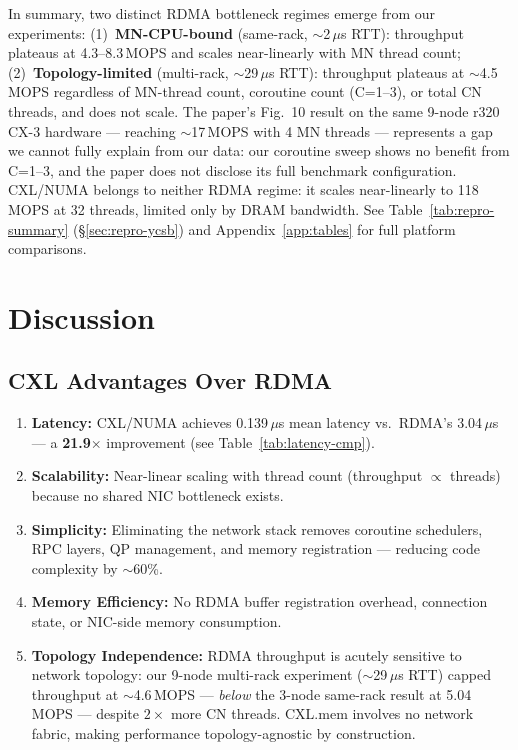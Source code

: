 \documentclass[conference]{IEEEtran}
\begin{document}
In summary, two distinct RDMA bottleneck regimes emerge from our experiments: (1)~\textbf{MN-CPU-bound} (same-rack, $\sim$2\,$\mu$s RTT): throughput plateaus at 4.3--8.3\,MOPS and scales near-linearly with MN thread count; (2)~\textbf{Topology-limited} (multi-rack, $\sim$29\,$\mu$s RTT): throughput plateaus at $\sim$4.5\,MOPS regardless of MN-thread count, coroutine count (C=1--3), or total CN threads, and does not scale. The paper's Fig.~10 result on the same 9-node r320 CX-3 hardware --- reaching $\sim$17\,MOPS with 4 MN threads --- represents a gap we cannot fully explain from our data: our coroutine sweep shows no benefit from C=1--3, and the paper does not disclose its full benchmark configuration. CXL/NUMA belongs to neither RDMA regime: it scales near-linearly to 118\,MOPS at 32 threads, limited only by DRAM bandwidth. See Table~\ref{tab:repro-summary} (\S\ref{sec:repro-ycsb}) and Appendix~\ref{app:tables} for full platform comparisons.

\section{Discussion}

\subsection{CXL Advantages Over RDMA}

\begin{enumerate}[nosep]
  \item \textbf{Latency:} CXL/NUMA achieves 0.139\,$\mu$s mean latency vs.\ RDMA's 3.04\,$\mu$s --- a \textbf{21.9$\times$} improvement (see Table~\ref{tab:latency-cmp}).
  \item \textbf{Scalability:} Near-linear scaling with thread count (throughput $\propto$ threads) because no shared NIC bottleneck exists.
  \item \textbf{Simplicity:} Eliminating the network stack removes coroutine schedulers, RPC layers, QP management, and memory registration --- reducing code complexity by $\sim$60\%.
  \item \textbf{Memory Efficiency:} No RDMA buffer registration overhead, connection state, or NIC-side memory consumption.
  \item \textbf{Topology Independence:} RDMA throughput is acutely sensitive to network topology: our 9-node multi-rack experiment ($\sim$29\,$\mu$s RTT) capped throughput at $\sim$4.6\,MOPS --- \emph{below} the 3-node same-rack result at 5.04\,MOPS --- despite $2\times$ more CN threads. CXL.mem involves no network fabric, making performance topology-agnostic by construction.
\end{enumerate}
\end{document}
